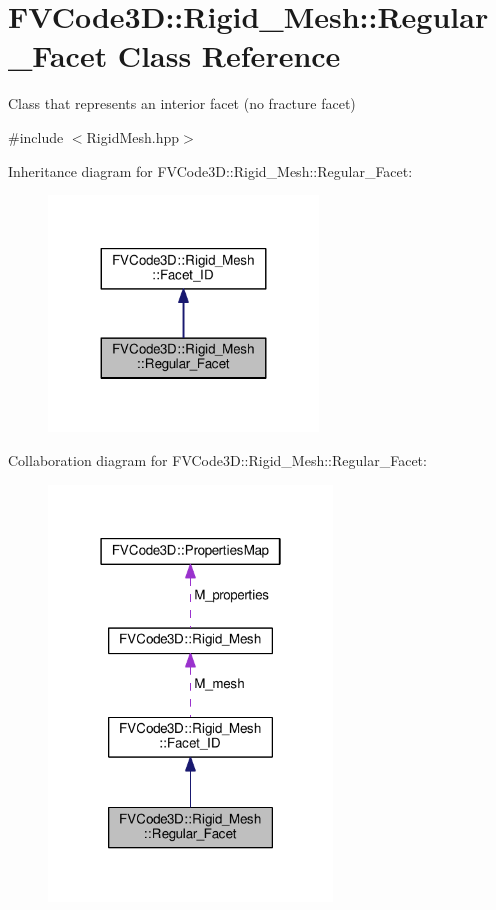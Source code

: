 \hypertarget{classFVCode3D_1_1Rigid__Mesh_1_1Regular__Facet}{}\section{F\+V\+Code3D\+:\+:Rigid\+\_\+\+Mesh\+:\+:Regular\+\_\+\+Facet Class Reference}
\label{classFVCode3D_1_1Rigid__Mesh_1_1Regular__Facet}


Class that represents an interior facet (no fracture facet)  




{\ttfamily \#include $<$Rigid\+Mesh.\+hpp$>$}



Inheritance diagram for F\+V\+Code3D\+:\+:Rigid\+\_\+\+Mesh\+:\+:Regular\+\_\+\+Facet\+:
\nopagebreak
\begin{figure}[H]
\begin{center}
\leavevmode
\includegraphics[width=203pt]{classFVCode3D_1_1Rigid__Mesh_1_1Regular__Facet__inherit__graph}
\end{center}
\end{figure}


Collaboration diagram for F\+V\+Code3D\+:\+:Rigid\+\_\+\+Mesh\+:\+:Regular\+\_\+\+Facet\+:
\nopagebreak
\begin{figure}[H]
\begin{center}
\leavevmode
\includegraphics[width=214pt]{classFVCode3D_1_1Rigid__Mesh_1_1Regular__Facet__coll__graph}
\end{center}
\end{figure}
